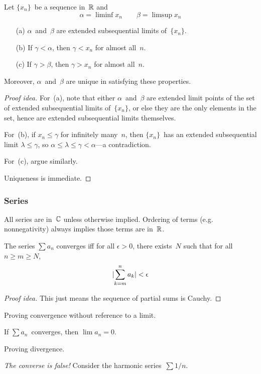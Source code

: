 \begin{thm}
Let \(\{x_n\}\)~be a sequence in~\(\mathbb{R}\) and
\[\alpha=\liminf x_n\qquad\beta=\limsup x_n\]
\begin{enumerate}[itemsep=0pt]
\item[(a)] \(\alpha\)~and~\(\beta\) are extended subsequential limits of~\(\{x_n\}\).
\item[(b)] If \(\gamma<\alpha\), then \(\gamma<x_n\) for almost all~\(n\).
\item[(c)] If \(\gamma>\beta\), then \(\gamma>x_n\) for almost all~\(n\).
\end{enumerate}
Moreover, \(\alpha\)~and~\(\beta\) are unique in satisfying these properties.
\end{thm}
\begin{proof}[Proof idea]
For~(a), note that either \(\alpha\)~and~\(\beta\) are extended limit points of the set of extended subsequential limits of~\(\{x_n\}\), or else they are the only elements in the set, hence are extended subsequential limits themselves.

For~(b), if \(x_n\le\gamma\) for infinitely many~\(n\), then \(\{x_n\}\)~has an extended subsequential limit \(\lambda\le\gamma\), so \(\alpha\le\lambda\le\gamma<\alpha\)---a contradiction.

For~(c), argue similarly.

Uniqueness is immediate.
\end{proof}

\subsubsection*{Series}
All series are in~\(\mathbb{C}\) unless otherwise implied. Ordering of terms (e.g. nonnegativity) always implies those terms are in~\(\mathbb{R}\).

\begin{thm}
The series \(\sum a_n\) converges iff for all \(\epsilon>0\), there exists~\(N\) such that for all \(n\ge m\ge N\),
\[|{\sum_{k=m}^n a_k}|<\epsilon\]
\end{thm}
\begin{proof}[Proof idea]
This just means the sequence of partial sums is Cauchy.
\end{proof}
\begin{app}
Proving convergence without reference to a limit.
\end{app}

\begin{cor}
If \(\sum a_n\)~converges, then \(\lim a_n=0\).
\end{cor}
\begin{app}
Proving divergence.
\end{app}
\begin{rmk}
\emph{The converse is false!} Consider the harmonic series~\(\sum 1/n\).
\end{rmk}

